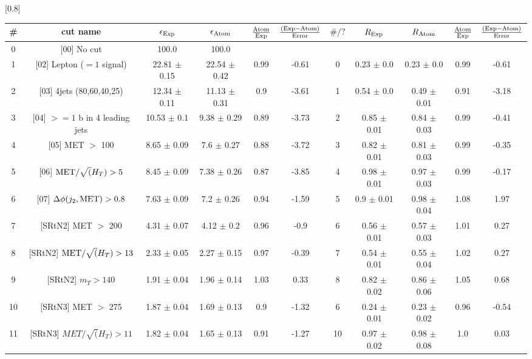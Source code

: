 \documentclass[12pt]{article}
\begin{document}
\renewcommand{\arraystretch}{1.3}
\begin{table}[h!]
\begin{center}
\scalebox{0.7}[0.8]{ 
\begin{tabular}{c|c||c|c|>{\columncolor{yellow}}c|c||c|c|c|>{\columncolor{yellow}}c|c}
\hline
\# & cut name & $\epsilon_{\rm Exp}$ & $\epsilon_{\rm Atom}$ & $\frac{\rm Atom}{\rm Exp}$ & $\frac{({\rm Exp} - {\rm Atom})}{\rm Error}$ & $\#/?$ & $R_{\rm Exp}$ & $R_{\rm Atom}$ & $\frac{\rm Atom}{\rm Exp}$ & $\frac{({\rm Exp} - {\rm Atom})}{\rm Error}$ \\
\hline
0 & [00] No cut & 100.0   & 100.0   &  &  &  &   &   &  &  \\
1 & [02] Lepton ($=1$ signal) & 22.81 $\pm$ 0.15 & 22.54 $\pm$ 0.42 & 0.99 & -0.61 & 0 & 0.23 $\pm$ 0.0 & 0.23 $\pm$ 0.0 & 0.99 & -0.61 \\
2 & [03] 4jets (80,60,40,25) & 12.34 $\pm$ 0.11 & 11.13 $\pm$ 0.31 & 0.9 & -3.61 & 1 & 0.54 $\pm$ 0.0 & 0.49 $\pm$ 0.01 & 0.91 & -3.18 \\
3 & [04] $>=1$ b in 4 leading jets & 10.53 $\pm$ 0.1 & 9.38 $\pm$ 0.29 & 0.89 & -3.73 & 2 & 0.85 $\pm$ 0.01 & 0.84 $\pm$ 0.03 & 0.99 & -0.41 \\
4 & [05] MET $>$ 100 & 8.65 $\pm$ 0.09 & 7.6 $\pm$ 0.27 & 0.88 & -3.72 & 3 & 0.82 $\pm$ 0.01 & 0.81 $\pm$ 0.03 & 0.99 & -0.35 \\
5 & [06] ${\rm MET}/\sqrt(H_T) > 5$ & 8.45 $\pm$ 0.09 & 7.38 $\pm$ 0.26 & 0.87 & -3.85 & 4 & 0.98 $\pm$ 0.01 & 0.97 $\pm$ 0.03 & 0.99 & -0.17 \\
6 & [07] $\Delta \phi(j_2, {\rm MET}) > 0.8$ & 7.63 $\pm$ 0.09 & 7.2 $\pm$ 0.26 & 0.94 & -1.59 & 5 & 0.9 $\pm$ 0.01 & 0.98 $\pm$ 0.04 & 1.08 & 1.97 \\
7 & [SRtN2] MET $>$ 200 & 4.31 $\pm$ 0.07 & 4.12 $\pm$ 0.2 & 0.96 & -0.9 & 6 & 0.56 $\pm$ 0.01 & 0.57 $\pm$ 0.03 & 1.01 & 0.27 \\
8 & [SRtN2] ${\rm MET}/\sqrt(H_T) > 13$ & 2.33 $\pm$ 0.05 & 2.27 $\pm$ 0.15 & 0.97 & -0.39 & 7 & 0.54 $\pm$ 0.01 & 0.55 $\pm$ 0.04 & 1.02 & 0.27 \\
9 & [SRtN2] $m_T > 140$ & 1.91 $\pm$ 0.04 & 1.96 $\pm$ 0.14 & 1.03 & 0.33 & 8 & 0.82 $\pm$ 0.02 & 0.86 $\pm$ 0.06 & 1.05 & 0.68 \\
10 & [SRtN3] MET $>$ 275 & 1.87 $\pm$ 0.04 & 1.69 $\pm$ 0.13 & 0.9 & -1.32 & 6 & 0.24 $\pm$ 0.01 & 0.23 $\pm$ 0.02 & 0.96 & -0.54 \\
11 & [SRtN3] $MET/\sqrt(H_T) > 11$ & 1.82 $\pm$ 0.04 & 1.65 $\pm$ 0.13 & 0.91 & -1.27 & 10 & 0.97 $\pm$ 0.02 & 0.98 $\pm$ 0.08 & 1.0 & 0.03 \\

\end{tabular}}
\end{center}
\end{table}
\end{document}

